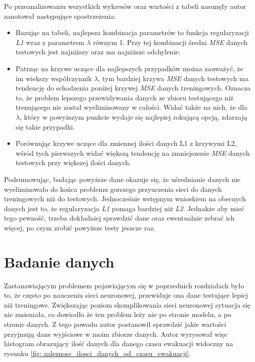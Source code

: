 \documentclass[12pt]{aghdpl}
\begin{document}
		Po przeanalizowaniu wszystkich wykresów oraz wartości z tabeli nasunęły autor zanotował następujące spostrzeżenia:
		\begin{itemize}
		\item Bazując na tabeli, najlepsza kombinacja parametrów to funkcja regularyzacji \textit{L1} wraz z parametrem $\lambda$ równym 1. Przy tej kombinacji średni \textit{MSE} danych testowych jest najniższy oraz ma najniższe odchylenie.
		\item Patrząc na krzywe uczące dla najlepszych przypadków można zauważyć, że im wiekszy współczynnik $\lambda$, tym bardziej krzywa \textit{MSE} danych testowych ma tendencję do schodzenia poniżej krzywej \textit{MSE} danych treningowych. Oznacza to, że problem lepszego przewidywania danych ze zbioru testującego niż trenującego nie został wyeliminowany w całości. Widać także na nich, że dla $\lambda$, który w powyższym punkcie wydaje się najlepiej rokującą opcją, zdarzają się takie przypadki.
		\item Porównując krzywe uczące dla zmiennej ilości danych L1 z krzywymi L2, wśród tych pierwszych widać większą tendencję na zmniejszenie \textit{MSE} danych testowych przy większej ilości danych.
		\end{itemize}				
		
		Podsumowując, badając powyższe dane okazuje się, że uśrednianie danych nie wyeliminowało do końca problemu gorszego przyuczenia sieci do danych treningowych niż do testowych. Jednocześnie wstępnym wnioskiem na obecnych danych jest to, że regularyzacja \textit{L1} pomaga bardziej niż \textit{L2}. Jednakże aby mieć tego pewność, trzeba dokładniej sprawdzić dane oraz ewentualnie zebrać ich więcej, po czym zrobić powyższe testy jeszcze raz.
		
		\section{Badanie danych}
		Zastanawiającym problemem pojawiającym się w poprzednich rozdziałach było to, że często po nauczeniu sieci neuronowej, przewiduje ona dane testujące lepiej niż treningowe. Zwiększając poziom skomplikowania sieci neuronowej sytuacja się nie zmieniała, co dowiodło że ten problem leży nie po stronie modelu, a po stronie danych. Z tego powodu autor postanowił sprawdzić jakie wartości przyjmują dane wyjściowe w moim zbiorze danych. Autor wyrysował więc histogram obrazujący ilość danych dla danego czasu ewakuacji widoczny na rysunku \ref{fig: zaleznosc_ilosci_danych_od_czasu_ewakuacji}.
		
\end{document}
